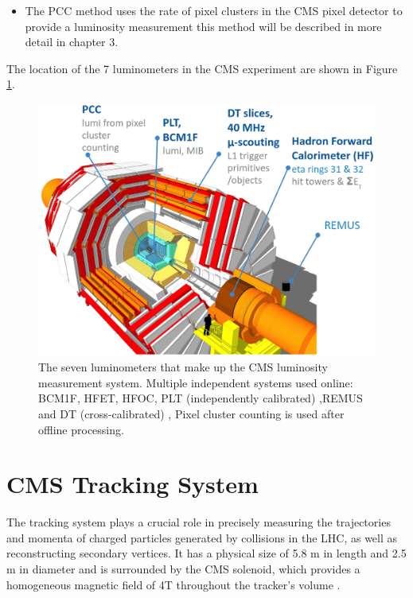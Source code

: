 \begin{itemize}
\item The PCC method uses the rate of pixel clusters in the CMS pixel detector to provide a luminosity measurement this method will be described in more detail in chapter 3.  
\end{itemize}

The location of the 7 luminometers in the CMS experiment are shown in Figure \ref{luminometers}.

\begin{center}
  \begin{figure}[ht]
    \centering
    \includegraphics[scale=.3]{Chapter2/detectors.png}
    \caption[CMS Luminometers]{The seven luminometers that make up the CMS luminosity measurement system. Multiple independent systems used online: BCM1F, HFET, HFOC, PLT (independently calibrated) ,REMUS and  DT (cross-calibrated) , Pixel cluster counting is used after offline processing.}
    \label{luminometers}
  \end{figure}
\end{center}

\section{CMS Tracking System}

The tracking system plays a crucial role in precisely measuring the trajectories and momenta of charged particles generated by collisions in the LHC, as well as reconstructing secondary vertices. It has a physical size of 5.8 m in length and 2.5 m in diameter and is surrounded by the CMS solenoid, which provides a homogeneous magnetic field of 4T throughout the tracker's volume \cite{CMS_Exp_2008}.

